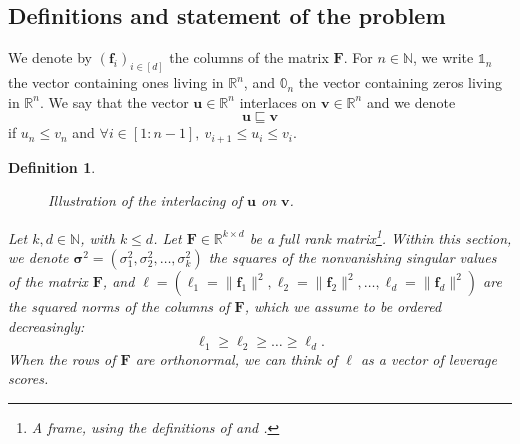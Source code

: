\documentclass[twoside,11pt]{book}
\newtheorem{definition}{Definition}
\numberwithin{theorem}{chapter}
\numberwithin{definition}{chapter}
\numberwithin{proposition}{chapter}
\numberwithin{corollary}{chapter}
\numberwithin{example}{chapter}
\numberwithin{lemma}{chapter}
\DeclareMathOperator{\Tran}{\intercal}
\begin{document}
\subsection{Definitions and statement of the problem}
 We denote by $(\bm{f}_{i})_{i \in [d]}$ the columns of the matrix $\bm{F}$. For $n \in \mathbb{N}$, we write $\mathbb{1}_{n}$ the vector containing ones living in $\mathbb{R}^{n}$, and $\mathbb{0}_{n}$ the vector containing zeros living in $\mathbb{R}^{n}$. We say that the vector $\bm{u} \in \mathbb{R}^{n}$ interlaces on $\bm{v} \in \mathbb{R}^{n}$ and we denote $$\bm{u} \sqsubseteq \bm{v}$$
if $u_{n} \leq v_{n}$ and $\forall i \in [1:n-1], \: v_{i+1} \leq u_{i} \leq v_{i}$.
\begin{definition}

\begin{figure}[!ht]
    \centering
    
    \caption{Illustration of the interlacing of $\bm{u}$ on $\bm{v}$.}
    \label{f:Interlacing_eigenvalues}
\end{figure}

Let $k, d \in \mathbb{N}$, with $k \leq d$. Let $\bm{F} \in \mathbb{R}^{k \times d}$ be a full rank matrix\footnote{A \emph{frame}, using the definitions of \citep{FiMiPo11} and \citep{FMPS13}.}.
Within this section, we denote $\bm{\sigma}^2 = (\sigma_{1}^2, \sigma_{2}^2, \dots ,\sigma_{k}^2)$ the squares of the nonvanishing singular values of the matrix $\bm{F}$, and $\bm{\ell} = (\ell_{1}=\|\bm{f}_{1}\|^{2}, \ell_{2}=\|\bm{f}_{2}\|^{2}, \dots, \ell_{d}=\|\bm{f}_{d}\|^{2})$ are the squared norms of the columns of $\bm{F}$, which we assume to be ordered decreasingly:
$$\ell_{1} \geq \ell_{2} \geq \dots \geq \ell_{d}.$$
 When the rows of $\bm{F}$ are orthonormal, we can think of $\bm{\ell}$ as a vector of leverage scores.
\end{definition}
\end{document}
